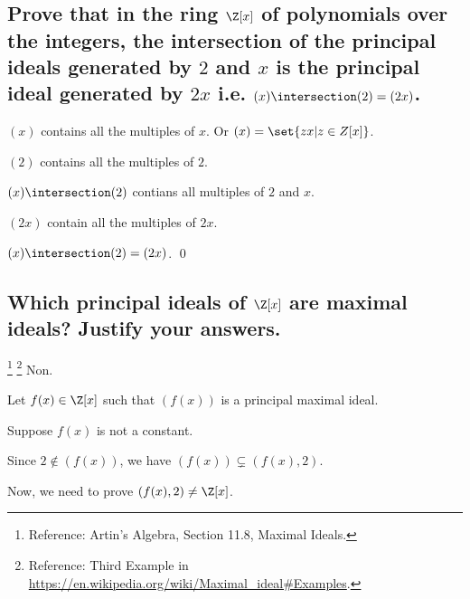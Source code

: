 \section[Problem 3]{}
    \subsection[(i)]{Prove that in the ring $\Z[x]$ of polynomials over the integers,
        the intersection of the principal ideals generated by $2$ and $x$ is the principal ideal
        generated by $2x$ i.e. $(x)\intersection(2) = (2x)$.
    }
        $(x)$ contains all the multiples of $x$. Or $(x) = \set{z x | z \in Z[x]}$.

        $(2)$ contains all the multiples of $2$.

        $(x) \intersection (2)$ contians all multiples of $2$ and $x$.

        $(2x)$ contain all the multiples of $2x$.

        $(x) \intersection (2) = (2x)$.
        \qed




    \subsection[(ii)]{Which principal ideals of $\Z[x]$ are maximal ideals? Justify your answers.}
        \footnote{Reference: Artin's Algebra, Section 11.8, Maximal Ideals.}
        \footnote{Reference: Third Example in \url{https://en.wikipedia.org/wiki/Maximal_ideal\#Examples}.}
        Non.

        Let $f(x) \in \Z[x]$ such that $(f(x))$ is a principal maximal ideal.


        Suppose $f(x)$ is not a constant.


        Since $2 \not\in (f(x))$, we have $(f(x)) \subsetneq (f(x), 2)$.

        Now, we need to prove $(f(x), 2) \neq \Z[x]$.

